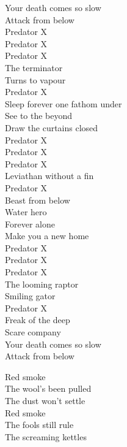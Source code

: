 Your death comes so slow \\
Attack from below \\

Predator X \\
Predator X \\
Predator X \\
The terminator \\
Turns to vapour \\
Predator X \\
Sleep forever one fathom under \\

See to the beyond \\
Draw the curtains closed \\

Predator X \\
Predator X \\
Predator X \\
Leviathan without a fin \\
Predator X \\
Beast from below \\
Water hero \\

Forever alone \\
Make you a new home \\

Predator X \\
Predator X \\
Predator X \\
The looming raptor \\
Smiling gator \\
Predator X \\
Freak of the deep \\
Scare company \\

Your death comes so slow \\
Attack from below \\




Red smoke \\
The wool's been pulled \\
The dust won't settle \\
Red smoke \\
The fools still rule \\
The screaming kettles\

